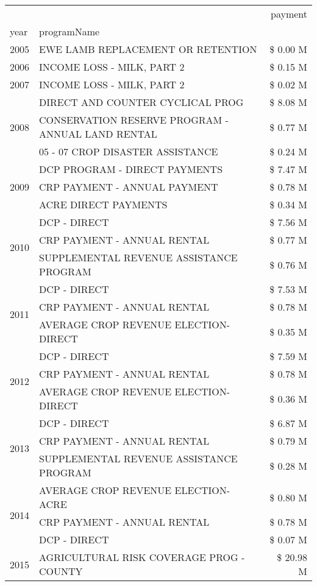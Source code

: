 \begin{tabular}{llr}
\toprule
 &  & payment \\
year & programName &  \\
\midrule
2005 & EWE LAMB REPLACEMENT OR RETENTION & \$ 0.00 M \\
\cline{1-3}
2006 & INCOME LOSS - MILK, PART 2 & \$ 0.15 M \\
\cline{1-3}
2007 & INCOME LOSS - MILK, PART 2 & \$ 0.02 M \\
\cline{1-3}
\multirow[t]{3}{*}{2008} & DIRECT AND COUNTER CYCLICAL PROG & \$ 8.08 M \\
 & CONSERVATION RESERVE PROGRAM - ANNUAL LAND RENTAL & \$ 0.77 M \\
 & 05 - 07 CROP DISASTER ASSISTANCE & \$ 0.24 M \\
\cline{1-3}
\multirow[t]{3}{*}{2009} & DCP PROGRAM - DIRECT PAYMENTS & \$ 7.47 M \\
 & CRP PAYMENT - ANNUAL PAYMENT & \$ 0.78 M \\
 & ACRE DIRECT PAYMENTS & \$ 0.34 M \\
\cline{1-3}
\multirow[t]{3}{*}{2010} & DCP - DIRECT & \$ 7.56 M \\
 & CRP PAYMENT - ANNUAL RENTAL & \$ 0.77 M \\
 & SUPPLEMENTAL REVENUE ASSISTANCE PROGRAM & \$ 0.76 M \\
\cline{1-3}
\multirow[t]{3}{*}{2011} & DCP - DIRECT & \$ 7.53 M \\
 & CRP PAYMENT - ANNUAL RENTAL & \$ 0.78 M \\
 & AVERAGE CROP REVENUE ELECTION-DIRECT & \$ 0.35 M \\
\cline{1-3}
\multirow[t]{3}{*}{2012} & DCP - DIRECT & \$ 7.59 M \\
 & CRP PAYMENT - ANNUAL RENTAL & \$ 0.78 M \\
 & AVERAGE CROP REVENUE ELECTION-DIRECT & \$ 0.36 M \\
\cline{1-3}
\multirow[t]{3}{*}{2013} & DCP - DIRECT & \$ 6.87 M \\
 & CRP PAYMENT - ANNUAL RENTAL & \$ 0.79 M \\
 & SUPPLEMENTAL REVENUE ASSISTANCE PROGRAM & \$ 0.28 M \\
\cline{1-3}
\multirow[t]{3}{*}{2014} & AVERAGE CROP REVENUE ELECTION-ACRE & \$ 0.80 M \\
 & CRP PAYMENT - ANNUAL RENTAL & \$ 0.78 M \\
 & DCP - DIRECT & \$ 0.07 M \\
\cline{1-3}
\multirow[t]{3}{*}{2015} & AGRICULTURAL RISK COVERAGE PROG - COUNTY & \$ 20.98 M \\

\end{tabular}
